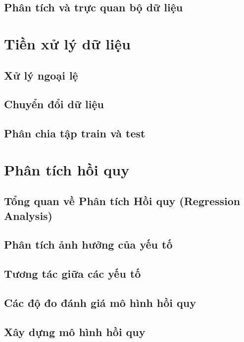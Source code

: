 \documentclass[runningheads]{llncs}
\begin{document}
\subsection{Phân tích và trực quan bộ dữ liệu}

\section{Tiền xử lý dữ liệu}

\subsection{Xử lý ngoại lệ}

\subsection{Chuyển đổi dữ liệu}

\subsection{Phân chia tập train và test}

\section{Phân tích hồi quy}

\subsection{Tổng quan về Phân tích Hồi quy (Regression Analysis)}

\subsection{Phân tích ảnh hưởng của yếu tố}

\subsection{Tương tác giữa các yếu tố}

\subsection{Các độ đo đánh giá mô hình hồi quy}

\subsection{Xây dựng mô hình hồi quy}
\end{document}
